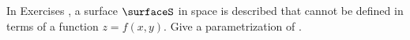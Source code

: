 {\noindent In Exercises}
{, a surface $\surfaceS$ in space is described that cannot be defined in terms of a function $z=f(x,y)$. Give a parametrization of \surfaceS.
}
